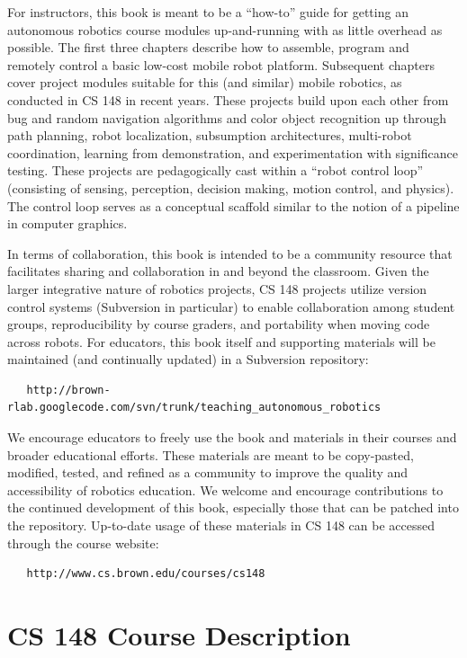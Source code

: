 For instructors, this book is meant to be a ``how-to'' guide for getting an autonomous robotics course modules up-and-running with as little overhead as possible.  The first three chapters describe how to assemble, program and remotely control a basic low-cost mobile robot platform.  Subsequent chapters cover project modules suitable for this (and similar) mobile robotics, as conducted in CS 148 in recent years.  These projects build upon each other from bug and random navigation algorithms and color object recognition up through path planning, robot localization, subsumption architectures, multi-robot coordination, learning from demonstration, and experimentation with significance testing.  These projects are pedagogically cast within a ``robot control loop'' (consisting of sensing, perception, decision making, motion control, and physics).  The control loop serves as a conceptual scaffold similar to the notion of a pipeline in computer graphics. 

In terms of collaboration, this book is intended to be a community resource that facilitates sharing and collaboration in and beyond the classroom.  Given the larger integrative nature of robotics projects, CS 148 projects utilize version control systems (Subversion in particular) to enable collaboration among student groups, reproducibility by course graders, and portability when moving code across robots.  For educators, this book itself and supporting materials will be maintained (and continually updated) in a Subversion repository:

\begin{verbatim}
   http://brown-rlab.googlecode.com/svn/trunk/teaching_autonomous_robotics
\end{verbatim}

We encourage educators to freely use the book and materials in their courses and broader educational efforts.  These materials are meant to be copy-pasted, modified, tested, and refined as a community to improve the quality and accessibility of robotics education.  We welcome and encourage contributions to the continued development of this book, especially those that can be patched into the repository.  Up-to-date usage of these materials in CS 148 can be accessed through the course website:

\begin{verbatim}
   http://www.cs.brown.edu/courses/cs148
\end{verbatim}



\section{CS 148 Course Description}

